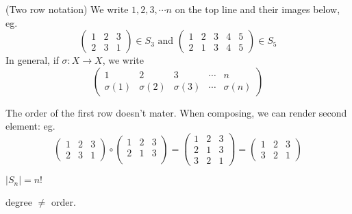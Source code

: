 \documentclass[a4paper]{article}
\begin{document}
\begin{notation}
  (Two row notation) We write $1, 2, 3, \cdots n$ on the top line and their images below, eg.
  \[
    \begin{pmatrix}
      1 & 2 & 3\\
      2 & 3 & 1
    \end{pmatrix}\in S_3 \text{ and }
    \begin{pmatrix}
      1 & 2 & 3 & 4 & 5\\
      2 & 1 & 3 & 4 & 5
    \end{pmatrix}\in S_5
  \]
  In general, if $\sigma: X\to X$, we write
  \[
    \begin{pmatrix}
      1 & 2 & 3 &\cdots& n\\
      \sigma(1) & \sigma(2)&\sigma(3) &\cdots& \sigma{(n)}
    \end{pmatrix}
  \]
  \begin{note}
    The order of the first row doesn't mater. When composing, we can render second element: eg.
    \[
      \begin{pmatrix}
        1 & 2 & 3\\
        2 & 3 & 1
      \end{pmatrix}
      \circ
      \begin{pmatrix}
        1 & 2 & 3\\
        2 & 1 & 3\\
      \end{pmatrix}
      =
      \begin{pmatrix}
        1 & 2 & 3\\
        2 & 1 & 3\\
        3 & 2 & 1
      \end{pmatrix}
      =
      \begin{pmatrix}
        1 & 2 & 3\\
        3 & 2 & 1
      \end{pmatrix}
    \]
  \end{note}
\end{notation}
\begin{prop}
  $|S_n| = n!$
\end{prop}
\note degree $\not=$ order.
\end{document}
